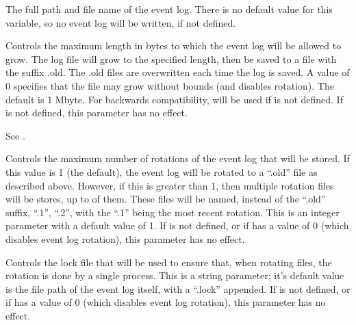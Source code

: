\begin{description}

\label{param:EventLog}
\item[\Macro{EVENT\_LOG}]
  The full path and file name of the event log.
  There is no default value for this variable,
  so no event log will be written, if not defined.

\label{param:EventLogMaxSize}
\item[\Macro{EVENT\_LOG\_MAX\_SIZE}]
  Controls the maximum length in bytes to which the event log
  will be allowed to grow. The log file will grow to the specified length,
  then be saved to a file with the suffix .old.
  The .old  files are overwritten each time the log is saved.
  A value of 0 specifies that the file may grow without bounds (and
  disables rotation).   The default is 1 Mbyte.
  For backwards compatibility,  will be used if
   is not defined.
  If  is not defined, this parameter has no effect.

\label{param:MaxEventLog}
\item[\Macro{MAX\_EVENT\_LOG}]
  See .

\label{param:EventLogMaxRotations}
\item[\Macro{EVENT\_LOG\_MAX\_ROTATIONS}]
  Controls the maximum number of rotations of the event log that
  will be stored.  If this value is 1 (the default), the event log
  will be rotated to a ``.old'' file as described above.  However, if
  this is greater than 1, then multiple rotation files will be stores,
  up to  of them.  These files
  will be named, instead of the ``.old'' suffix, ``.1'', ``.2'', with
  the ``.1'' being the most recent rotation.  This is an integer
  parameter with a default value of 1.
  If  is not defined, or if
   has a value of 0 (which disables
  event log rotation), this parameter has no effect.

\label{param:EventLogRotationLock}
\item[\Macro{EVENT\_LOG\_ROTATION\_LOCK}]
  Controls the lock file that will be used to ensure that, when
  rotating files, the rotation is done by a single process.  This is a
  string parameter; it's default value is the file path of the
  event log itself, with a ``.lock'' appended.
  If  is not defined, or if
   has a value of 0 (which disables
  event log rotation), this parameter has no effect.


\end{description}

